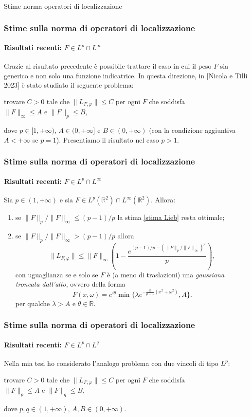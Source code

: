 \documentclass[aspectratio=141]{beamer}
\newcommand{\R}{\mathbb{R}} %
\begin{document}
\begin{section}{Stime norma operatori di localizzazione}
	\begin{frame}
		\frametitle{Stime sulla norma di operatori di localizzazione}
		\framesubtitle{Risultati recenti: $F \in L^p \cap L^{\infty}$}
		Grazie al risultato precedente è possibile trattare il caso in cui il peso $F$ sia generico e non solo una funzione indicatrice. In questa direzione, in [Nicola e Tilli 2023] è stato studiato il seguente problema:
		\begin{center}
			trovare $C>0$ tale che $\|L_{F,\varphi}\| \leq C$ per ogni $F$ che soddisfa\\
			$\|F\|_{\infty} \leq A$ e $\|F\|_{p} \leq B$,			
		\end{center}
		dove $p \in [1,+\infty)$, $A \in (0, +\infty]$ e $B \in (0, +\infty)$ (con la condizione aggiuntiva $A<+\infty$ se $p=1$). Presentiamo il risultato nel caso $p>1$.
	\end{frame}

	\begin{frame}
		\frametitle{Stime sulla norma di operatori di localizzazione}
		\framesubtitle{Risultati recenti: $F \in L^p \cap L^{\infty}$}
		\vspace{-3mm}
		\begin{myblock}
			Sia $p \in (1, +\infty)$ e sia $F \in L^p(\R^2) \cap L^{\infty}(\R^2)$. Allora:
			\begin{enumerate}
				\item se $\|F\|_p / \|F\|_{\infty}  \leq (p-1)/p$ la stima \eqref{stima Lieb} resta ottimale;
				\pause
				\item se $\|F\|_p / \|F\|_{\infty} > (p-1)/p$ allora
				\begin{equation*}
					\|L_{F,\varphi}\| \leq \|F\|_{\infty} \left(1 - \dfrac{e^{(p-1)/p - (\|F\|_p / \|F\|_{\infty})^p}}{p}\right),
				\end{equation*}
				con uguaglianza se e solo se $F$ è (a meno di traslazioni) una \emph{gaussiana troncata dall'alto}, ovvero della forma
				\begin{equation*}
					F(x,\omega) = e^{i\theta} \min \{\lambda e^{-\frac{\pi}{p-1}(x^2 + \omega^2)}, A\}.
				\end{equation*}
				per qualche $\lambda > A$ e $\theta \in \R$.
			\end{enumerate}
		\end{myblock}
	\end{frame}


	\begin{frame}
		\frametitle{Stime sulla norma di operatori di localizzazione}
		\framesubtitle{Risultati recenti: $F \in L^p \cap L^q$}
		Nella mia tesi ho considerato l'analogo problema con due vincoli di tipo $L^p$:
		\begin{center}
			trovare $C>0$ tale che $\|L_{F,\varphi}\| \leq C$ per ogni $F$ che soddisfa\\
			$\|F\|_{p} \leq A$ e $\|F\|_{q} \leq B$,			
		\end{center}
		dove $p, q \in (1,+\infty)$, $A,B \in (0, +\infty)$.
	\end{frame}


\end{section}
\end{document}
